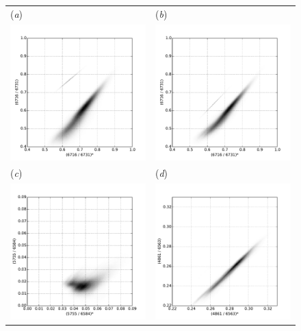 \documentclass[preprint]{aastex}
\begin{document}
\begin{figure}
  \centering
  \begin{tabular}{ll}
    (\textit{a}) & (\textit{b}) \\
    \includegraphics[width=0.45\linewidth]{contam-correct-FQ672N-FQ674N-F673N}
    &
    \includegraphics[width=0.45\linewidth]{contam-correct-FQ672N-FQ674N-F547M} \\
    (\textit{c}) & (\textit{d}) \\
    \includegraphics[width=0.45\linewidth]{contam-correct-FQ575N-F658N-F547M}
    &
    \includegraphics[width=0.45\linewidth]{contam-correct-F487N-F656N-F547M}

\end{tabular}
\end{figure}
\end{document}
